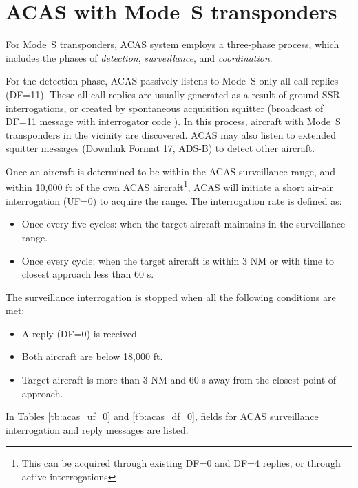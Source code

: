 \section{ACAS with Mode~S transponders}

For Mode~S transponders, ACAS system employs a three-phase process, which includes the phases of \emph{detection}, \emph{surveillance}, and \emph{coordination}.

For the detection phase, ACAS passively listens to Mode~S only all-call replies (DF=11). These all-call replies are usually generated as a result of ground SSR interrogations, or created by spontaneous acquisition squitter (broadcast of DF=11 message with interrogator code \0). In this process, aircraft with Mode~S transponders in the vicinity are discovered. ACAS may also listen to extended squitter messages (Downlink Format 17, ADS-B) to detect other aircraft.

Once an aircraft is determined to be within the ACAS surveillance range, and within 10,000 ft of the own ACAS aircraft\footnote{This can be acquired through existing DF=0 and DF=4 replies, or through active interrogations}, ACAS will initiate a short air-air interrogation (UF=0) to acquire the range. The interrogation rate is defined as:

\begin{itemize}
  \item Once every five cycles: when the target aircraft maintains in the surveillance range.
  \item Once every cycle: when the target aircraft is within 3 NM or with time to closest approach less than 60 s.
\end{itemize}


The surveillance interrogation is stopped when all the following conditions are met:

\begin{itemize}
  \item A reply (DF=0) is received
  \item Both aircraft are below 18,000 ft.
  \item Target aircraft is more than 3 NM and 60 s away from the closest point of approach.
\end{itemize}


In Tables \ref{tb:acas_uf_0} and \ref{tb:acas_df_0}, fields for ACAS surveillance interrogation and reply messages are listed.

